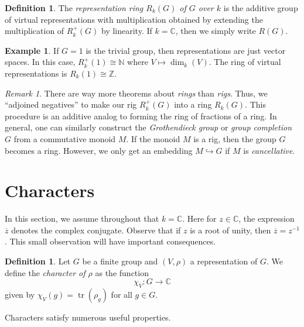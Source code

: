 \documentclass[12pt]{article}
\theoremstyle{plain}
\theoremstyle{definition}
\newtheorem{definition}[theorem]{Definition}
\newtheorem{example}[theorem]{Example}
\theoremstyle{remark}
\newtheorem{remark}[theorem]{Remark}
\numberwithin{equation}{section}
\begin{document}
\begin{definition}
The \emph{representation ring $R_k(G)$ of $G$ over $k$} is
the additive group of virtual representations with multiplication
obtained by extending the multiplication of $R^+_k(G)$ by linearity.
If $k=\mathbb{C}$, then we simply write $R(G)$.
\end{definition}

\begin{example}
If $G=1$ is the trivial group, then representations are just vector spaces.
In this case, $R^+_k(1) \cong \mathbb{N}$ where $V \mapsto \dim_k(V)$.
The ring of virtual representations is $R_k(1) \cong \mathbb{Z}$.
\end{example}

\begin{remark}
There are way more theorems about \emph{rings} than \emph{rigs}.
Thus, we ``adjoined negatives'' to make our rig $R^+_k(G)$
into a ring $R_k(G)$.
This procedure is an additive analog to forming the ring of fractions of a ring.
In general, one can similarly construct the \emph{Grothendieck group}
or \emph{group completion} $G$ from a commutative monoid $M$.
If the monoid $M$ is a rig, then the group $G$ becomes a ring.
However, we only get an embedding $M \hookrightarrow G$ if
$M$ is \emph{cancellative}.
\end{remark}

\section{Characters}

In this section, we assume throughout that $k=\mathbb{C}$.
Here for $z \in \mathbb{C}$, the expression $\overline{z}$ denotes the
complex conjugate.  Observe that if $z$ is a root of unity, then
$\overline{z}=z^{-1}$.  This small observation will have important
consequences.

\begin{definition}
Let $G$ be a finite group and $(V,\rho)$ a representation of $G$.
We define the \emph{character of $\rho$} as the function
\[
\chi_V : G \to \mathbb{C}
\]
given by $\chi_V(g)=\operatorname{tr}(\rho_g)$ for all $g \in G$. 
\end{definition}

Characters satisfy numerous useful properties.
\end{document}
